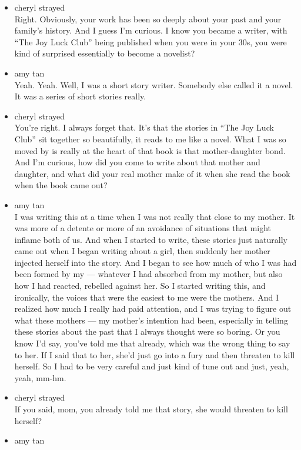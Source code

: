 \begin{itemize}
\item
  cheryl strayed\\
  Right. Obviously, your work has been so deeply about your past and
  your family's history. And I guess I'm curious. I know you became a
  writer, with ``The Joy Luck Club'' being published when you were in
  your 30s, you were kind of surprised essentially to become a novelist?
\item
  amy tan\\
  Yeah. Yeah. Well, I was a short story writer. Somebody else called it
  a novel. It was a series of short stories really.
\item
  cheryl strayed\\
  You're right. I always forget that. It's that the stories in ``The Joy
  Luck Club'' sit together so beautifully, it reads to me like a novel.
  What I was so moved by is really at the heart of that book is that
  mother-daughter bond. And I'm curious, how did you come to write about
  that mother and daughter, and what did your real mother make of it
  when she read the book when the book came out?
\item
  amy tan\\
  I was writing this at a time when I was not really that close to my
  mother. It was more of a detente or more of an avoidance of situations
  that might inflame both of us. And when I started to write, these
  stories just naturally came out when I began writing about a girl,
  then suddenly her mother injected herself into the story. And I began
  to see how much of who I was had been formed by my --- whatever I had
  absorbed from my mother, but also how I had reacted, rebelled against
  her. So I started writing this, and ironically, the voices that were
  the easiest to me were the mothers. And I realized how much I really
  had paid attention, and I was trying to figure out what these mothers
  --- my mother's intention had been, especially in telling these
  stories about the past that I always thought were so boring. Or you
  know I'd say, you've told me that already, which was the wrong thing
  to say to her. If I said that to her, she'd just go into a fury and
  then threaten to kill herself. So I had to be very careful and just
  kind of tune out and just, yeah, yeah, mm-hm.
\item
  cheryl strayed\\
  If you said, mom, you already told me that story, she would threaten
  to kill herself?
\item
  amy tan\\

\end{itemize}
